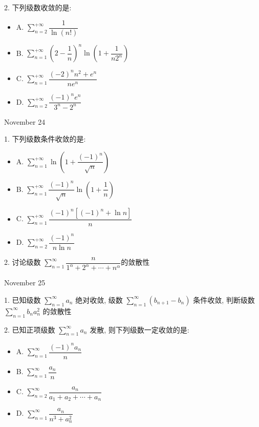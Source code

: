 2. 下列级数收敛的是:
\begin{itemize}
	\item A. $\sum\limits_{n=2}^{+\infty}\dfrac{1}{\ln(n!)}$
	\item B. $\sum\limits_{n=1}^{+\infty}(2-\dfrac{1}{n})^{n}\ln(1+\dfrac{1}{n2^{n}})$
	\item C. $\sum\limits_{n=1}^{+\infty}\dfrac{(-2)^{n}n^2+e^{n}}{ne^{n}}$
	\item D. $\sum\limits_{n=2}^{+\infty}\dfrac{(-1)^{n}e^{n}}{3^{n}-2^{n}}$
\end{itemize}
\begin{solution}
	
\end{solution}

\textcolor{purplea}{November 24}

1. 下列级数条件收敛的是:
\begin{itemize}
	\item A. $\sum\limits_{n=1}^{+\infty}\ln\left( 1+\dfrac{(-1)^n}{\sqrt{n}}\right) $
	\item B. $\sum\limits_{n=1}^{+\infty}\dfrac{(-1)^n}{\sqrt{n}}\ln(1+\dfrac{1}{n})$
	\item C. $\sum\limits_{n=1}^{+\infty}\dfrac{(-1)^{n}\left[(-1)^{n}+\ln n \right] }{n}$
	\item D. $\sum\limits_{n=2}^{+\infty}\dfrac{(-1)^{n}}{n\ln n}$
\end{itemize}
\begin{solution}
	
\end{solution}

2. 讨论级数 $\sum\limits_{n=1}^{\infty}\dfrac{n}{1^{\alpha}+2^{\alpha}+\cdots+n^{\alpha}}$的敛散性
\begin{solution}
	
\end{solution}

\textcolor{purplea}{November 25}

1. 已知级数 $\sum\limits_{n=1}^{\infty}a_{n}$ 绝对收敛,
级数 $\sum\limits_{n=1}^{\infty}(b_{n+1}-b_{n})$ 条件收敛,
判断级数 $\sum\limits_{n=1}^{\infty}b_{n}a_{n}^{2}$ 的敛散性
\begin{solution}
	
\end{solution}
 
2. 已知正项级数 $\sum\limits_{n=1}^{\infty}a_{n}$ 发散, 则下列级数一定收敛的是:
\begin{itemize}
	\item A. $\sum\limits_{n=1}^{\infty}\dfrac{(-1)^{n}a_{n}}{n}$
	\item B. $\sum\limits_{n=1}^{\infty}\dfrac{a_{n}}{n}$
	\item C. $\sum\limits_{n=2}^{\infty}\dfrac{a_{n}}{a_{1}+a_{2}+\cdots+a_{n}}$
	\item D. $\sum\limits_{n=1}^{\infty}\dfrac{a_{n}}{n^{3}+a_{n}^{2}}$
\end{itemize}
\begin{solution}
	
\end{solution}

